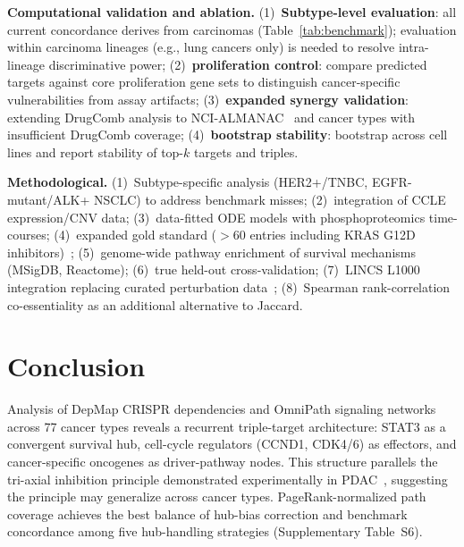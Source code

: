 \documentclass[11pt]{article}
\begin{document}
\textbf{Computational validation and ablation.} (1)~\textbf{Subtype-level evaluation}: all current concordance derives from carcinomas (Table~\ref{tab:benchmark}); evaluation within carcinoma lineages (e.g., lung cancers only) is needed to resolve intra-lineage discriminative power; (2)~\textbf{proliferation control}: compare predicted targets against core proliferation gene sets to distinguish cancer-specific vulnerabilities from assay artifacts; (3)~\textbf{expanded synergy validation}: extending DrugComb analysis to NCI-ALMANAC~\cite{Holbeck2017} and cancer types with insufficient DrugComb coverage; (4)~\textbf{bootstrap stability}: bootstrap across cell lines and report stability of top-$k$ targets and triples.

\textbf{Methodological.} (1)~Subtype-specific analysis (HER2+/TNBC, EGFR-mutant/ALK+ NSCLC) to address benchmark misses; (2)~integration of CCLE expression/CNV data; (3)~data-fitted ODE models with phosphoproteomics time-courses; (4)~expanded gold standard ($>$60 entries including KRAS G12D inhibitors)~\cite{Menden2019,Holbeck2017}; (5)~genome-wide pathway enrichment of survival mechanisms (MSigDB, Reactome); (6)~true held-out cross-validation; (7)~LINCS L1000 integration replacing curated perturbation data~\cite{Subramanian2017}; (8)~Spearman rank-correlation co-essentiality as an additional alternative to Jaccard.

\section*{Conclusion}

Analysis of DepMap CRISPR dependencies and OmniPath signaling networks across 77 cancer types reveals a recurrent triple-target architecture: STAT3 as a convergent survival hub, cell-cycle regulators (CCND1, CDK4/6) as effectors, and cancer-specific oncogenes as driver-pathway nodes. This structure parallels the tri-axial inhibition principle demonstrated experimentally in PDAC~\cite{Liaki2025}, suggesting the principle may generalize across cancer types. PageRank-normalized path coverage achieves the best balance of hub-bias correction and benchmark concordance among five hub-handling strategies (Supplementary Table~S6).
\end{document}
